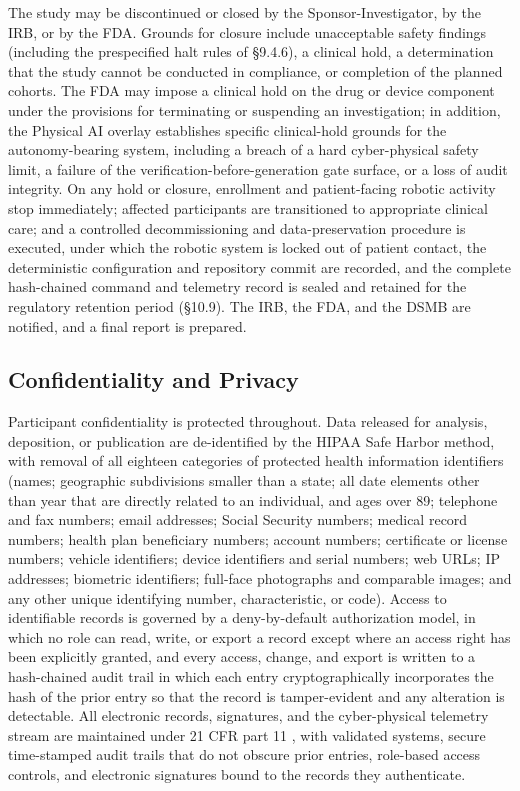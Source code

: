 The study may be discontinued or closed by the Sponsor-Investigator, by the IRB,
or by the FDA. Grounds for closure include unacceptable safety findings (including
the prespecified halt rules of \S9.4.6), a clinical hold, a determination that the
study cannot be conducted in compliance, or completion of the planned cohorts. The
FDA may impose a clinical hold on the drug or device component under the
provisions for terminating or suspending an investigation; in addition, the
Physical AI overlay establishes specific clinical-hold grounds for the
autonomy-bearing system, including a breach of a hard cyber-physical safety limit,
a failure of the verification-before-generation gate surface, or a loss of audit
integrity. On any hold or closure, enrollment and patient-facing robotic activity
stop immediately; affected participants are transitioned to appropriate clinical
care; and a controlled decommissioning and data-preservation procedure is executed,
under which the robotic system is locked out of patient contact, the deterministic
configuration and repository commit are recorded, and the complete hash-chained
command and telemetry record is sealed and retained for the regulatory retention
period (\S10.9). The IRB, the FDA, and the DSMB are notified, and a final report is
prepared.

\subsection{Confidentiality and Privacy}

Participant confidentiality is protected throughout. Data released for analysis,
deposition, or publication are de-identified by the HIPAA Safe Harbor method, with
removal of all eighteen categories of protected health information identifiers
(names; geographic subdivisions smaller than a state; all date elements other than
year that are directly related to an individual, and ages over 89; telephone and
fax numbers; email addresses; Social Security numbers; medical record numbers;
health plan beneficiary numbers; account numbers; certificate or license numbers;
vehicle identifiers; device identifiers and serial numbers; web URLs; IP
addresses; biometric identifiers; full-face photographs and comparable images;
and any other unique identifying number, characteristic, or code). Access to
identifiable records is governed by a deny-by-default authorization model, in which
no role can read, write, or export a record except where an access right has been
explicitly granted, and every access, change, and export is written to a
hash-chained audit trail in which each entry cryptographically incorporates the
hash of the prior entry so that the record is tamper-evident and any alteration is
detectable. All electronic records, signatures, and the cyber-physical telemetry
stream are maintained under 21 CFR part 11 \cite{ecfr2026part11}, with validated
systems, secure time-stamped audit trails that do not obscure prior entries,
role-based access controls, and electronic signatures bound to the records they
authenticate.


